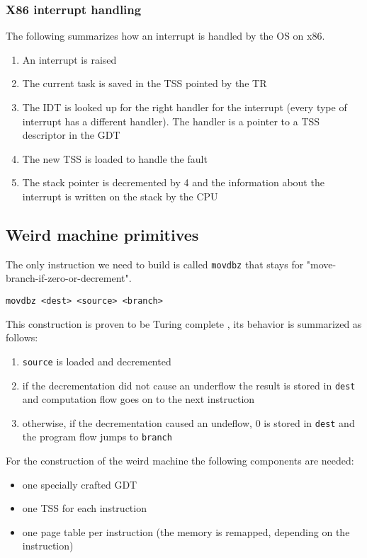\documentclass[11pt,twoside,a4paper]{article}
\begin{document}
\subsubsection{X86 interrupt handling}

The following summarizes how an interrupt is handled by the OS on x86.

\begin{enumerate}
\item An interrupt is raised
\item The current task is saved in the TSS pointed by the TR
\item The IDT is looked up for the right handler for the interrupt (every type of interrupt has a different handler). The handler is a pointer to a TSS descriptor in the GDT
\item The new TSS is loaded to handle the fault
\item The stack pointer is decremented by 4 and the information about the interrupt is written on the stack by the CPU
\end{enumerate}

\subsection{Weird machine primitives}

The only instruction we need to build is called \texttt{movdbz} that stays for "move-branch-if-zero-or-decrement".

\texttt{movdbz <dest> <source> <branch>}

This construction is proven to be Turing complete \cite{mmu_machine}, its behavior is summarized as follows:
\begin{enumerate}
\item \texttt{source} is loaded and decremented
\item if the decrementation did not cause an underflow the result is stored in \texttt{dest} and computation flow goes on to the next instruction
\item otherwise, if the decrementation caused an undeflow, 0 is stored in \texttt{dest} and the program flow jumps to \texttt{branch}
\end{enumerate}

For the construction of the weird machine the following components are needed:
\begin{itemize}
\item one specially crafted GDT
\item one TSS for each instruction
\item one page table per instruction (the memory is remapped, depending on the instruction)
\end{itemize}
\end{document}
